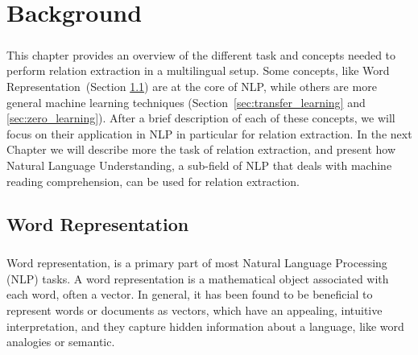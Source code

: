 \chapter{Background}
\label{chpt:2}
\paragraph{}
This chapter provides an overview of the different task and concepts needed to perform relation extraction in a multilingual setup. Some concepts, like Word Representation~(Section \ref{sec:word_embedding}) are at the core of NLP, while others are more general machine learning techniques (Section~\ref{sec:transfer_learning} and \ref{sec:zero_learning}). After a brief description of each of these concepts, we will focus on their application in NLP in particular for relation extraction. In the next Chapter we will describe more the task of relation extraction, and present how Natural Language Understanding, a sub-field of NLP that deals with machine reading comprehension, can be used for relation extraction.




\section{Word Representation}
\label{sec:word_embedding}
\paragraph{}
Word representation, is a primary part of most Natural Language Processing (NLP) tasks. A word representation is a mathematical object associated with each word, often a vector.  In general, it has been found to be beneficial to represent words or documents as vectors, which have an appealing, intuitive interpretation, and they capture hidden information about a language, like word analogies or semantic. 

